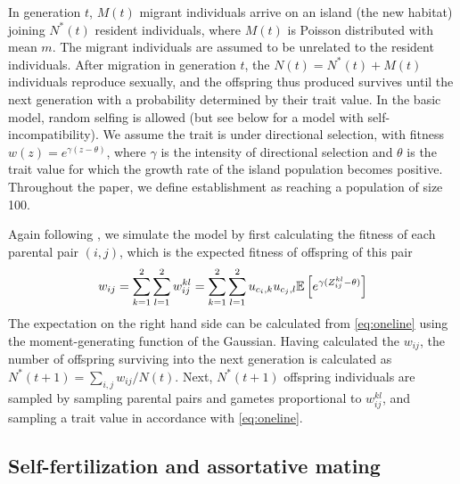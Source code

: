\documentclass[12pt,a4paper]{article}
\begin{document}
In generation $t$, $M(t)$ migrant individuals arrive on an island (the new
habitat) joining $N^\ast(t)$ resident individuals, where $M(t)$ is Poisson
distributed with mean $m$. 
The migrant individuals are assumed to be unrelated to the resident
individuals.
After migration in generation $t$, the $N(t) = N^\ast(t) + M(t)$ individuals
reproduce sexually, and the offspring thus produced survives until the next
generation with a probability determined by their trait value.
In the basic model, random selfing is allowed (but see below for a model with
self-incompatibility).
We assume the trait is under directional selection, with fitness $w(z) =
e^{\gamma(z - \theta)}$, where $\gamma$ is the intensity of directional
selection and $\theta$ is the trait value for which the growth rate of the
island population becomes positive.
Throughout the paper, we define establishment as reaching a population of size
100.

Again following \cite{barton2018}, we simulate the model by first calculating
the fitness of each parental pair $(i,j)$, which is the expected fitness of
offspring of this pair
\begin{equation}
  w_{ij}
    = \sum_{k=1}^2\sum_{l=1}^2 w_{ij}^{kl}
    = \sum_{k=1}^2\sum_{l=1}^2 u_{c_{i},k}u_{c_{j},l}
        \mathbb{E}\left[e^{\gamma(Z_{ij}^{kl} - \theta)}\right]
\end{equation}
The expectation on the right hand side can be calculated from \cref{eq:oneline}
using the moment-generating function of the Gaussian.
Having calculated the $w_{ij}$, the number of offspring surviving into the next
generation is calculated as $N^\ast(t+1) = \sum_{i,j}w_{ij}/N(t)$.
Next, $N^\ast(t+1)$ offspring individuals are sampled by sampling parental
pairs and gametes proportional to $w_{ij}^{kl}$, and sampling a trait value
in accordance with \cref{eq:oneline}. 


\subsection*{Self-fertilization and assortative mating}
\end{document}
